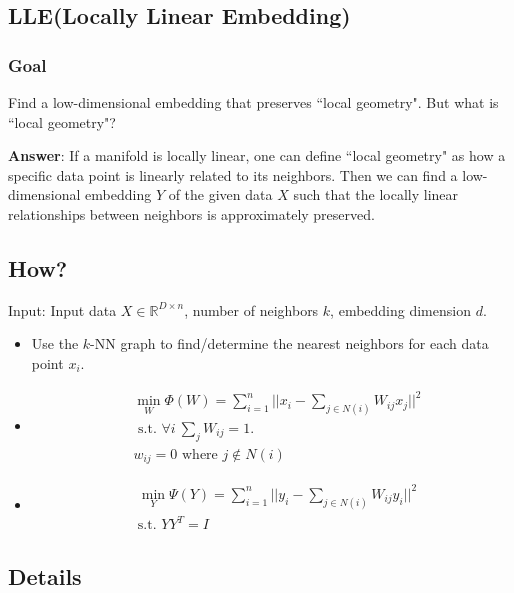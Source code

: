 \subsection{LLE(Locally Linear Embedding)}
\subsubsection*{Goal}
Find a low-dimensional embedding that preserves ``local geometry". But
what is ``local geometry"? 

\textbf{Answer}: If a manifold is locally linear, one can define
``local geometry" as how a specific data point is linearly related to
its neighbors. Then we can find a low-dimensional embedding $Y$ of the
given data $X$ such that the locally linear relationships between
neighbors is approximately preserved. 

\subsection*{How?}
Input: Input data $X\in \mathbb{R}^{D\times n}$, number of neighbors
$k$, embedding dimension $d$. 
\begin{itemize}
\item Use the $k$-NN graph to find/determine the nearest neighbors for
  each data point $x_i$. 
\item 
\begin{align*}
&\min_{W} \Phi(W) = \sum_{i=1}^n \bigg|\bigg|x_i - \sum_{j\in N(i)}
  W_{ij} x_j\bigg|\bigg|^2\\ 
&\text{ s.t. } \forall i \ \sum_{j} W_{ij}=1.\\
&w_{ij}=0 \text{ where } j \not \in N(i)
\end{align*}
\item 
\begin{align*}
&\min_{Y} \Psi(Y) = \sum_{i=1}^{n} ||y_i - \sum_{j\in N(i)} W_{ij}
  y_i||^2\\ 
&\text{s.t. } Y Y^T = I 
\end{align*}
\end{itemize}


\subsection*{Details}
